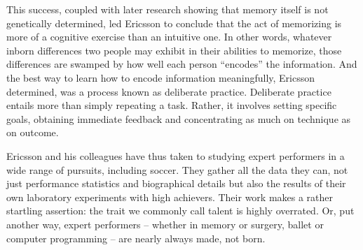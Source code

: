 \documentclass[a4paper]{article}
\begin{document}
\par
This success, coupled with later research showing that memory itself is not genetically determined, led Ericsson to conclude that the act of memorizing is more of a cognitive exercise than an intuitive one. In other words, whatever inborn differences two people may exhibit in their abilities to memorize, those differences are swamped by how well each person “encodes” the information. And the best way to learn how to encode information meaningfully, Ericsson determined, was a process known as deliberate practice. Deliberate practice entails more than simply repeating a task. Rather, it involves setting specific goals, obtaining immediate feedback and concentrating as much on technique as on outcome.

\par
Ericsson and his colleagues have thus taken to studying expert performers in a wide range of pursuits, including soccer. They gather all the data they can, not just performance statistics and biographical details but also the results of their own laboratory experiments with high achievers. Their work makes a rather startling assertion: the trait we commonly call talent is highly overrated. Or, put another way, expert performers – whether in memory or surgery, ballet or computer programming – are nearly always made, not born.
\end{document}
